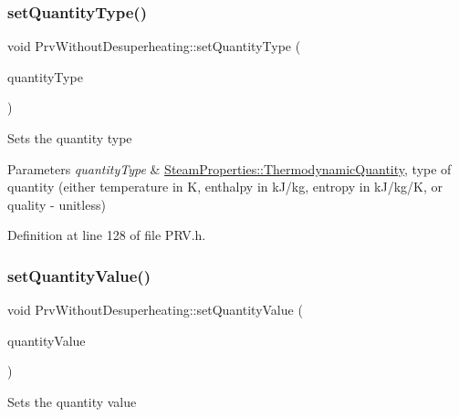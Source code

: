 \subsubsection{\texorpdfstring{set\+Quantity\+Type()}{setQuantityType()}\hspace{0.1cm}{\footnotesize\ttfamily [3/3]}}
{\footnotesize\ttfamily void Prv\+Without\+Desuperheating\+::set\+Quantity\+Type (\begin{DoxyParamCaption}\item[{\hyperlink{class_steam_properties_ae0294bedf7d178c2d8fb6aed0f62fbff}{Steam\+Properties\+::\+Thermodynamic\+Quantity}}]{quantity\+Type }\end{DoxyParamCaption})\hspace{0.3cm}{\ttfamily [inline]}}

Sets the quantity type


\begin{DoxyParams}{Parameters}
{\em quantity\+Type} & \hyperlink{class_steam_properties_ae0294bedf7d178c2d8fb6aed0f62fbff}{Steam\+Properties\+::\+Thermodynamic\+Quantity}, type of quantity (either temperature in K, enthalpy in k\+J/kg, entropy in k\+J/kg/K, or quality -\/ unitless) \\
\hline
\end{DoxyParams}


Definition at line 128 of file P\+R\+V.\+h.

\mbox{\label{class_prv_without_desuperheating_a5ed2d0f0f558705d482ed0502131757f}} 
\subsubsection{\texorpdfstring{set\+Quantity\+Value()}{setQuantityValue()}\hspace{0.1cm}{\footnotesize\ttfamily [1/3]}}
{\footnotesize\ttfamily void Prv\+Without\+Desuperheating\+::set\+Quantity\+Value (\begin{DoxyParamCaption}\item[{double}]{quantity\+Value }\end{DoxyParamCaption})\hspace{0.3cm}{\ttfamily [inline]}}

Sets the quantity value


